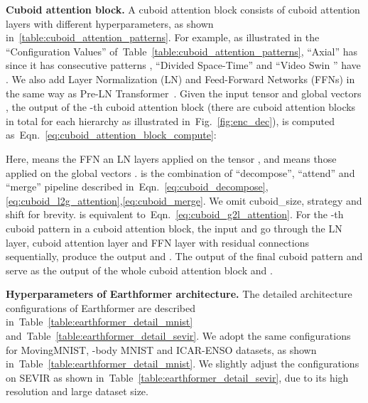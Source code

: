 \documentclass{article}
\newcommand{\tabref}[1]{Table~\ref{#1}}
\newcommand{\figref}[1]{Fig.~\ref{#1}}
\newcommand{\eqnref}[1]{Eqn.~\ref{#1}}
\renewcommand{\paragraph}[1]{\textbf{#1. }}
\def\nbody{-body MNIST}
\begin{document}
 \paragraph{Cuboid attention block}
 A cuboid attention block consists of  cuboid attention layers with different hyperparameters, as shown in~\ref{table:cuboid_attention_patterns}. For example, as illustrated in the ``Configuration Values'' of~\tabref{table:cuboid_attention_patterns}, ``Axial'' has  since it has  consecutive patterns , ``Divided Space-Time'' and ``Video Swin '' have . We also add Layer Normalization (LN) and Feed-Forward Networks (FFNs) in the same way as Pre-LN Transformer~\cite{xiong2020layer}. Given the input tensor  and global vectors , the output  of the -th cuboid attention block (there are  cuboid attention blocks in total for each hierarchy as illustrated in~\figref{fig:enc_dec}), is computed as~\eqnref{eq:cuboid_attention_block_compute}:
 


 
 
 Here,  means the FFN an LN layers applied on the tensor , and  means those applied on the global vectors . 
 is the combination of ``decompose'', ``attend'' and ``merge'' pipeline described in~\eqnref{eq:cuboid_decompose},\ref{eq:cuboid_l2g_attention},\ref{eq:cuboid_merge}.
 We omit cuboid\_size, strategy and shift for brevity.
  is equivalent to~\eqnref{eq:cuboid_g2l_attention}.
 For the -th cuboid pattern in a cuboid attention block, the input  and  go through the LN layer, cuboid attention layer and FFN layer with residual connections sequentially, produce the output  and . 
 The output of the final cuboid pattern  and  serve as the output of the whole cuboid attention block  and .

\paragraph{Hyperparameters of Earthformer architecture}
The detailed architecture configurations of Earthformer are described in~\tabref{table:earthformer_detail_mnist} and~\tabref{table:earthformer_detail_sevir}. We adopt the same configurations for MovingMNIST, \nbody{} and ICAR-ENSO datasets, as shown in~\tabref{table:earthformer_detail_mnist}. We slightly adjust the configurations on SEVIR as shown in~\tabref{table:earthformer_detail_sevir}, due to its high resolution and large dataset size.
\end{document}
